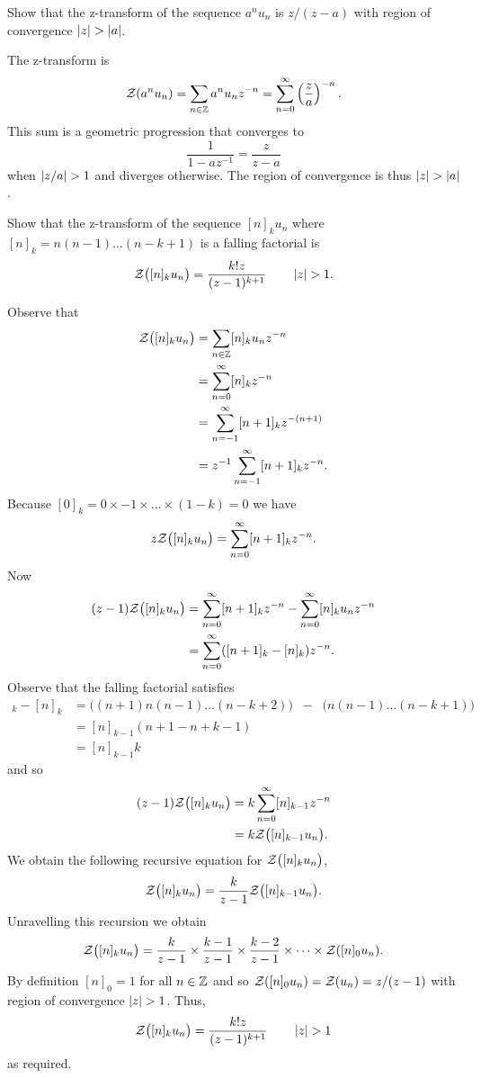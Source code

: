 \begin{excersizelist}
\item \label{exer:stepseqZtrans} Show that the z-transform of the sequence  $a^nu_n$ is $z/(z-a)$ with region of convergence $\left\vert z \right\vert > \left\vert a \right\vert$.
\begin{solution}
The z-transform is
\[
{\mathcal Z}(a^nu_n) = \sum_{n \in {\mathbb Z}} a^n u_n z^{-n} = \sum_{n=0}^\infty \left(\frac{z}{a}\right)^{-n}.
\]
This sum is a geometric progression that converges to 
\[
\frac{1}{1- a z^{-1}} = \frac{z}{ z-a}
\]
when $\left\vert z/a \right\vert > 1$ and diverges otherwise.  The region of convergence is thus $\left\vert z \right\vert > \left\vert a \right\vert$.
\end{solution}

\item \label{exer:fallingfacztransform} Show that the z-transform of the sequence $[n]_k u_n$ where $[n]_k = n(n-1)\dots(n-k+1)$ is a falling factorial is
\[
{\mathcal Z}\big( [n]_k u_n  \big) = \frac{k! z }{(z - 1)^{k+1}} \qquad \left\vert z \right\vert > 1.
\]
\begin{solution}
Observe that
\begin{align*}
{\mathcal Z}\big( [n]_{k} u_n  \big) &= \sum_{n\in{\mathbb Z}} [n]_k u_n z^{-n} \\ 
&= \sum_{n=0}^\infty [n]_k z^{-n} \\ 
&= \sum_{n=-1}^\infty [n+1]_k z^{-(n+1)} \\
&= z^{-1} \sum_{n=-1}^\infty [n+1]_k z^{-n}.
\end{align*}
Because $[0]_k = 0 \times -1 \times \dots \times (1-k)= 0$ we have
\[
z {\mathcal Z}\big( [n]_{k} u_n  \big) = \sum_{n=0}^\infty [n+1]_k z^{-n}.
\]  
Now
\begin{align*}
(z - 1) {\mathcal Z}\big( [n]_{k} u_n  \big) &= \sum_{n=0}^\infty [n+1]_k z^{-n} - \sum_{n=0}^\infty [n]_k u_n z^{-n} \\
&= \sum_{n=0}^\infty ([n+1]_k - [n]_k) z^{-n}.
\end{align*}
Observe that the falling factorial satisfies
\begin{align*}
[n+1]_k - [n]_k &= \big( (n+1)n(n-1)\dots(n-k+2) \big) \;\;  - \;\; \big(n(n-1)\dots(n-k+1)\big) \\
&= [n]_{k-1}(n+1 - n+k-1) \\
&= [n]_{k-1} k
\end{align*}
and so
\begin{align*}
(z - 1) {\mathcal Z}\big( [n]_{k} u_n  \big) &= k \sum_{n=0}^\infty  [n]_{k-1} z^{-n} \\
&= k {\mathcal Z}\big( [n]_{k-1} u_n  \big).
\end{align*}
We obtain the following recursive equation for ${\mathcal Z}\big( [n]_{k} u_n  \big)$,
\[
{\mathcal Z}\big( [n]_{k} u_n  \big) = \frac{k}{z-1} {\mathcal Z}\big( [n]_{k-1} u_n  \big).
\]
Unravelling this recursion we obtain
\[
{\mathcal Z}\big( [n]_{k} u_n  \big) = \frac{k}{z-1} \times \frac{k-1}{z-1} \times \frac{k-2}{z-1} \times \dots \times {\mathcal Z}( [n]_0 u_n ).
\]
By definition $[n]_0 = 1$ for all $n \in {\mathbb Z}$ and so ${\mathcal Z}( [n]_0 u_n ) = {\mathcal Z}( u_n ) = z/(z-1)$ with region of convergence $\left\vert z \right\vert >1$.  Thus,
\[
{\mathcal Z}\big( [n]_{k} u_n  \big) = \frac{k! z}{(z-1)^{k+1}} \qquad \left\vert z \right\vert > 1
\]
as required.
\end{solution}


\end{excersizelist}
